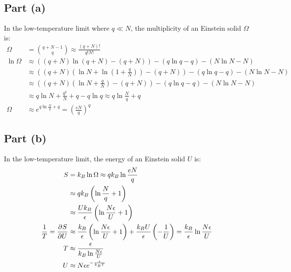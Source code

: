 \documentclass{article}
\begin{document}
\subsection*{Part (a)}
In the low-temperature limit where $q \ll N$, the multiplicity of an Einstein solid $\Omega$ is:
\begin{equation}
    \begin{split}
        \Omega & = {q + N - 1 \choose q} \approx \frac{\left(q + N\right)!}{q!N!} \\
        \ln\Omega & \approx \left(\left(q + N\right)\ln\left(q + N\right) - \left(q + N\right)\right) - \left(q\ln q - q\right) - \left(N\ln N - N\right) \\
        & \approx \left(\left(q + N\right)\left(\ln N + \ln\left(1 + \frac{q}{N}\right)\right) - \left(q + N\right)\right) - \left(q\ln q - q\right) - \left(N\ln N - N\right) \\
        & \approx \left(\left(q + N\right)\left(\ln N + \frac{q}{N}\right) - \left(q + N\right)\right) - \left(q\ln q - q\right) - \left(N\ln N - N\right) \\
        & \approx q\ln N + \frac{q^2}{N} + q - q\ln q \approx q\ln\frac{N}{q} + q \\
        \Omega & \approx e^{q\ln\frac{N}{q} + q} = {\left(\frac{eN}{q}\right)}^q
    \end{split}
\end{equation}
\subsection*{Part (b)}
In the low-temperature limit, the energy of an Einstein solid $U$ is:
\begin{equation}
    \begin{split}
        S & = k_B\ln\Omega \approx qk_B\ln\frac{eN}{q} \\
        & \approx qk_B\left(\ln \frac{N}{q} + 1\right) \\
        & \approx \frac{Uk_B}{\epsilon}\left(\ln \frac{N\epsilon}{U} + 1\right) \\
        \frac{1}{T} = \frac{\partial^{}S} {\partial U^{}} & \approx \frac{k_B}{\epsilon}\left(\ln \frac{N\epsilon}{U} + 1\right) + \frac{k_B U}{\epsilon}\left(-\frac{1}{U}\right) = \frac{k_B}{\epsilon}\ln\frac{N\epsilon}{U} \\
        T & \approx \frac{\epsilon}{k_B\ln\frac{N\epsilon}{U}} \\
        U & \approx N\epsilon e^{-\frac{\epsilon}{k_B T}} \\
    \end{split}
\end{equation}
\end{document}
